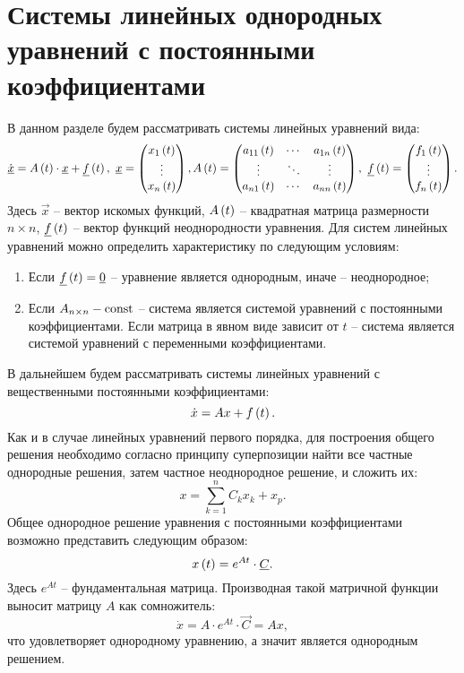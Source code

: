 \section{Системы линейных однородных уравнений с постоянными коэффициентами}

	В данном разделе будем рассматривать системы линейных уравнений вида:
	\[ 
		\dot{\underline{x}} = A \left( t \right) \cdot \underline{x} + \underline{f}\left( t \right), ~ 
		\underline{x} = \begin{pmatrix} x_1 \left( t \right) \\ \vdots \\ x_n \left( t \right) \end{pmatrix},
		A \left( t \right) = \begin{pmatrix} a_{11} \left( t \right) & \cdots & a_{1n} \left( t \right) \\ \vdots & \ddots & \vdots \\ a_{n1} \left( t \right) & \cdots & a_{nn} \left( t \right) \end{pmatrix}, ~
		\underline{f} \left( t \right) = \begin{pmatrix} f_1 \left( t \right) \\ \vdots \\ f_n \left( t \right) \end{pmatrix}.
	\]
	Здесь $\vec{x}$ -- вектор искомых функций, $A \left( t \right)$ -- квадратная матрица размерности $n \times n$, $\underline{f} \left( t \right)$ -- вектор функций неоднородности уравнения. Для систем линейных уравнений можно определить характеристику по следующим условиям:
	\begin{enumerate}
		\item Если \( \underline{f}\left( t \right) = \underline{0} \) -- уравнение является однородным, иначе -- неоднородное;
		\item Если \( A_{n \times n} - \mathrm{const} \) -- система является системой уравнений с постоянными коэффициентами. Если матрица в явном виде зависит от $t$ -- система является системой уравнений с переменными коэффициентами.
	\end{enumerate}
	В дальнейшем будем рассматривать системы линейных уравнений с вещественными постоянными коэффициентами:
	\[ \dot{x} = A x + f\left( t \right). \]
	Как и в случае линейных уравнений первого порядка, для построения общего решения необходимо согласно принципу суперпозиции найти все частные однородные решения, затем частное неоднородное решение, и сложить их:
	\[ x = \sum_{k = 1}^n C_k x_k + x_p. \]
	Общее однородное решение уравнения с постоянными коэффициентами возможно представить следующим образом:
	\[ x\left( t \right) = e^{At} \cdot \underline{C}. \]
	Здесь $e^{At}$ -- фундаментальная матрица. Производная такой матричной функции выносит матрицу $A$ как сомножитель:
	\[ \dot{x} = A \cdot e^{At} \cdot \vec{C} = A x, \]
	что удовлетворяет однородному уравнению, а значит является однородным решением.

